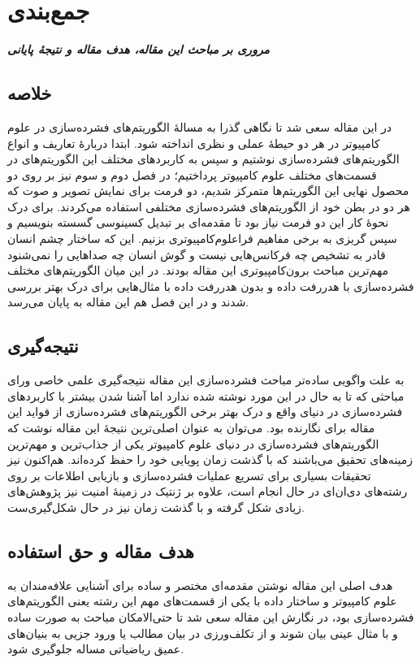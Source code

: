 \chapter{جمع‌بندی}
\noindent
\textbf{
	\textit{
      مروری بر مباحث این مقاله، هدف مقاله و نتیجهٔ پایانی
	}
}
\pagebreak

\section{خلاصه}
در این مقاله سعی شد تا نگاهی گذرا به مسالهٔ الگوریتم‌های فشرده‌سازی در علوم کامپیوتر در هر دو حیطهٔ عملی و نظری انداخته شود.
ابتدا دربارهٔ تعاریف و انواع الگوریتم‌های فشرده‌سازی نوشتیم و سپس به کاربردهای مختلف این الگوریتم‌های در قسمت‌های مختلف علوم کامپیوتر پرداختیم؛ 
در فصل دوم و سوم نیز بر روی دو محصول نهایی این الگوریتم‌ها متمرکز شدیم، دو فرمت برای نمایش تصویر و صوت که 
هر دو در بطن خود از الگوریتم‌های فشرده‌سازی مختلفی استفاده می‌کردند. 
برای درک نحوهٔ کار این دو فرمت نیاز بود تا مقدمه‌ای بر تبدیل کسینوسی گسسته بنویسیم و سپس گریزی به برخی مفاهیم فراعلوم‌کامپیوتری 
بزنیم. این که ساختار چشم انسان قادر به تشخیص چه فرکانس‌هایی نیست و گوش انسان چه صداهایی را نمی‌شنود مهم‌ترین مباحث برون‌کامپیوتری این 
مقاله بودند. در این میان الگوریتم‌های مختلف فشرده‌سازی با هدررفت داده و بدون هدررفت داده با مثال‌هایی برای درک بهتر
بررسی شدند و در این فصل هم این مقاله به پایان می‌رسد.

\section{نتیجه‌گیری}
به علت واگویی ساده‌تر مباحث فشرده‌سازی این مقاله نتیجه‌گیری علمی خاصی ورای مباحثی که تا به حال در این مورد نوشته شده ندارد اما 
آشنا شدن بیشتر با کاربردهای فشرده‌سازی در دنیای واقع و درک بهتر برخی الگوریتم‌های فشرده‌سازی از فواید این مقاله برای نگارنده بود. می‌توان به عنوان
اصلی‌ترین نتیجهٔ این مقاله نوشت که الگوریتم‌های فشرده‌سازی در دنیای علوم کامپیوتر یکی از جذاب‌ترین و مهم‌ترین زمینه‌های تحقیق
می‌باشند که با گذشت زمان پویایی خود را حفظ کرده‌اند. هم‌اکنون نیز تحقیقات بسیاری برای تسریع عملیات فشرده‌سازی و بازیابی اطلاعات بر روی رشته‌های دی‌ان‌ای 
در حال انجام است، علاوه بر ژنتیک در زمینهٔ امنیت نیز پژو‌هش‌های زیادی شکل گرفته و با گذشت زمان نیز در حال شکل‌گیری‌ست. 

\section{هدف مقاله و حق استفاده}
هدف اصلی این مقاله نوشتن مقدمه‌ای مختصر و ساده برای آشنایی علافه‌مندان به علوم کامپیوتر و ساختار داده با یکی از قسمت‌های مهم
این رشته یعنی الگوریتم‌های فشرده‌سازی بود، در نگارش این مقاله سعی شد تا حتی‌الامکان مباحث به صورت ساده و با مثال عینی بیان شوند و از 
تکلف‌ورزی در بیان مطالب یا ورود جزیی به بنیان‌های عمیق ریاضیاتی مساله جلوگیری شود. 

